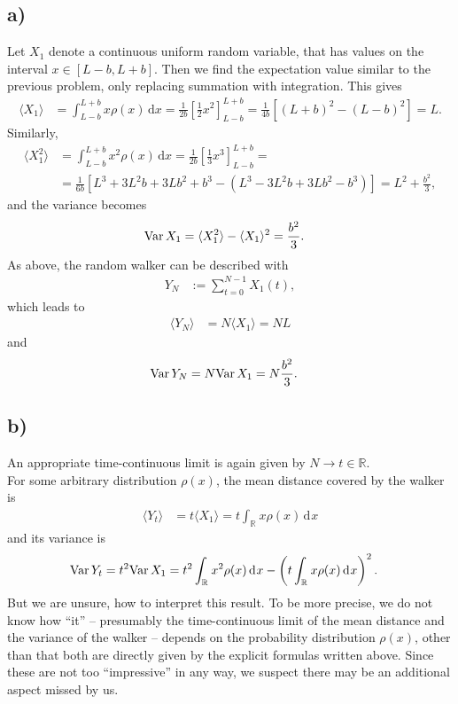 \documentclass[english, parskip=full]{scrartcl}
\newcommand{\bra}{}
\newcommand{\intx}{}
\newcommand{\intr}{}
\newcommand{\kla}{}
\newcommand{\klam}{}
\newcommand{\tecxt}{}
\begin{document}
\subsection*{a)}
Let $X_1$ denote a continuous uniform random variable, that has values on the interval $x\in\klam\left[ L-b,L+b \right]$.
Then we find the expectation value similar to the previous problem, only replacing summation with integration.
This gives
\begin{align}
\bra\langle X_1 \rangle&=\intx\int_{L-b}^{L+b}x\rho(x)\, \mathrm{d}x=\frac{1}{2b}\klam\left[ \frac{1}{2}x^2 \right]^{L+b}_{L-b}=\frac{1}{4b} \klam\left[ (L+b)^2-(L-b)^2 \right]=L.
\end{align}
Similarly, 
\begin{align}
\bra\langle X_1^2 \rangle&=\intx\int_{L-b}^{L+b}x^2\rho(x)\, \mathrm{d}x=\frac{1}{2b}\klam\left[ \frac{1}{3}x^3 \right]^{L+b}_{L-b}=\\
&=\frac{1}{6b}\klam\left[ L^3+3L^2b+3Lb^2+b^3-\kla\left( L^3-3L^2b+3Lb^2-b^3 \right) \right]=L^2+\frac{b^2}{3},
\end{align}
and the variance becomes
\begin{align}
\tecxt\text{Var\,}X_1&=\bra\langle X_1^2 \rangle-\bra\langle X_1 \rangle^2=\frac{b^2}{3}.
\end{align}
As above, the random walker can be described with
\begin{align}
Y_N&:=\sum_{t=0}^{N-1}X_1(t),
\end{align}
which leads to
\begin{align}
\bra\langle Y_N \rangle&=N\bra\langle X_1 \rangle=NL
\end{align}
and
\begin{align}
\tecxt\text{Var\,}Y_N&=N\tecxt\text{Var\,}X_1=N\frac{b^2}{3}.
\end{align}
\subsection*{b)}
An appropriate time-continuous limit is again given by $N\rightarrow t\in\mathbb{R}$.\\
For some arbitrary distribution $\rho(x)$, the mean distance covered by the walker is
\begin{align}
\langle Y_t \rangle&=t\langle X_1 \rangle=t \intr\int_{\mathbb{R}^{ }} x\rho(x) \, \mathrm{d}^{ }x
\end{align}
and its variance is
\begin{align}
\tecxt\text{Var\,}Y_t&=t^2\tecxt\text{Var\,}X_1=t^2\intr\int_{\mathbb{R}^{ }} x^2\rho(x) \, \mathrm{d}^{ }x-\kla\left( t\intr\int_{\mathbb{R}^{ }} x\rho(x) \, \mathrm{d}^{ }x \right)^2.
\end{align}
But we are unsure, how to interpret this result.
To be more precise, we do not know how ``it'' -- presumably the time-continuous limit of the mean distance and the variance of the walker -- depends on the probability distribution $\rho(x)$, other than that both are directly given by the explicit formulas written above.
Since these are not too ``impressive'' in any way, we suspect there may be an additional aspect missed by us.

\end{document}
